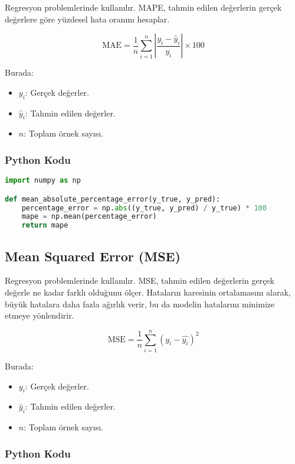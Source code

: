 Regresyon problemlerinde kullanılır. MAPE, tahmin edilen değerlerin gerçek değerlere göre yüzdesel hata oranını hesaplar. 

\[ \text{MAE} = \frac{1}{n} \sum_{i=1}^{n} |\frac{y_i - \hat{y}_i}{y_i}| \times 100 \]

Burada:

\begin{itemize}
    \item $y_i$: Gerçek değerler.
    \item $\hat{y}_i$: Tahmin edilen değerler.
    \item $n$: Toplam örnek sayısı.
\end{itemize}

\subsubsection{Python Kodu}

\begin{lstlisting}[language=Python]
import numpy as np

def mean_absolute_percentage_error(y_true, y_pred):
    percentage_error = np.abs((y_true, y_pred) / y_true) * 100
    mape = np.mean(percentage_error)
    return mape
\end{lstlisting}

\newpage

\subsection{Mean Squared Error (MSE)}

Regresyon problemlerinde kullanılır. MSE, tahmin edilen değerlerin gerçek değerle ne kadar farklı olduğunu ölçer. Hataların karesinin ortalamasını alarak, büyük hatalara daha fazla ağırlık verir, bu da modelin hatalarını minimize etmeye yönlendirir.

\[ \text{MSE} = \frac{1}{n} \sum_{i=1}^{n} (y_i - \hat{y_i})^2 \]

Burada:

\begin{itemize}
    \item $y_i$: Gerçek değerler.
    \item $\hat{y}_i$: Tahmin edilen değerler.
    \item $n$: Toplam örnek sayısı.
\end{itemize}

\subsubsection{Python Kodu}

